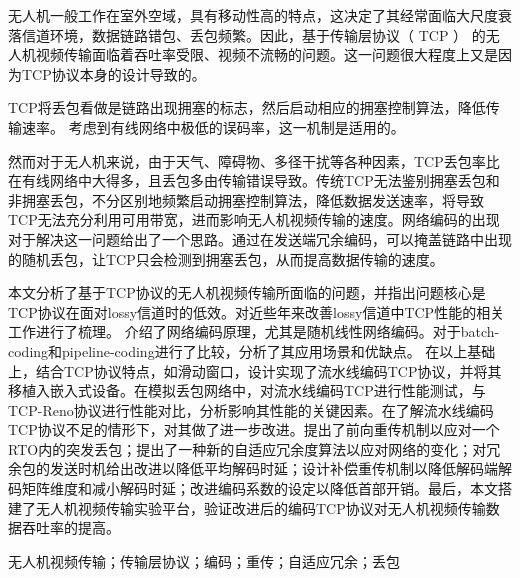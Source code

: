 \cabstract
{
	无人机一般工作在室外空域，具有移动性高的特点，这决定了其经常面临大尺度衰落信道环境，数据链路错包、丢包频繁。因此，基于传输层协议（ TCP ） 的无人机视频传输面临着吞吐率受限、视频不流畅的问题。这一问题很大程度上又是因为TCP协议本身的设计导致的。
	\par
	TCP将丢包看做是链路出现拥塞的标志，然后启动相应的拥塞控制算法，降低传输速率。
	考虑到有线网络中极低的误码率，这一机制是适用的。
	\par
	然而对于无人机来说，由于天气、障碍物、多径干扰等各种因素，TCP丢包率比在有线网络中大得多，且丢包多由传输错误导致。传统TCP无法鉴别拥塞丢包和非拥塞丢包，不分区别地频繁启动拥塞控制算法，降低数据发送速率，将导致TCP无法充分利用可用带宽，进而影响无人机视频传输的速度。网络编码的出现对于解决这一问题给出了一个思路。通过在发送端冗余编码，可以掩盖链路中出现的随机丢包，让TCP只会检测到拥塞丢包，从而提高数据传输的速度。
	\par
	本文分析了基于TCP协议的无人机视频传输所面临的问题，并指出问题核心是TCP协议在面对lossy信道时的低效。对近些年来改善lossy信道中TCP性能的相关工作进行了梳理。
	介绍了网络编码原理，尤其是随机线性网络编码。对于batch-coding和pipeline-coding进行了比较，分析了其应用场景和优缺点。
	在以上基础上，结合TCP协议特点，如滑动窗口，设计实现了流水线编码TCP协议，并将其移植入嵌入式设备。在模拟丢包网络中，对流水线编码TCP进行性能测试，与TCP-Reno协议进行性能对比，分析影响其性能的关键因素。在了解流水线编码TCP协议不足的情形下，对其做了进一步改进。提出了前向重传机制以应对一个RTO内的突发丢包；提出了一种新的自适应冗余度算法以应对网络的变化；对冗余包的发送时机给出改进以降低平均解码时延；设计补偿重传机制以降低解码端解码矩阵维度和减小解码时延；改进编码系数的设定以降低首部开销。最后，本文搭建了无人机视频传输实验平台，验证改进后的编码TCP协议对无人机视频传输数据吞吐率的提高。
	\par
	
}
{无人机视频传输；传输层协议；编码；重传；自适应冗余；丢包} 	%